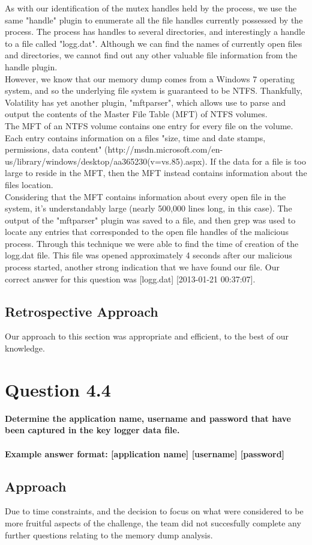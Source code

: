 As with our identification of the mutex handles held by the process, we use the same "handle" plugin to enumerate all the file handles currently possessed by the process. The process has handles to several directories, and interestingly a handle to a file called "logg.dat". Although we can find the names of currently open files and directories, we cannot find out any other valuable file information from the handle plugin.\\
However, we know that our memory dump comes from a Windows 7 operating system, and so the underlying file system is guaranteed to be NTFS. Thankfully, Volatility has yet another plugin, "mftparser", which allows use to parse and output the contents of the Master File Table (MFT) of NTFS volumes.\\
The MFT of an NTFS volume contains one entry for every file on the volume. Each entry contains information on a files "size, time and date stamps, permissions, data content" (http://msdn.microsoft.com/en-us/library/windows/desktop/aa365230(v=vs.85).aspx). If the data for a file is too large to reside in the MFT, then the MFT instead contains information about the files location.\\
Considering that the MFT contains information about every open file in the system, it's understandably large (nearly 500,000 lines long, in this case). The output of the "mftparser" plugin was saved to a file, and then grep was used to locate any entries that corresponded to the open file handles of the malicious process. Through this technique we were able to find the time of creation of the logg.dat file. This file was opened approximately 4 seconds after our malicious process started, another strong indication that we have found our file. Our correct answer for this question was [logg.dat] [2013-01-21 00:37:07]. 
\subsection{Retrospective Approach}
Our approach to this section was appropriate and efficient, to the best of our knowledge. 
\section{Question 4.4}
\textbf{Determine the application name, username and password that have been
captured in the key logger data file.
\\\\
Example answer format: [application name] [username] [password]}
\subsection{Approach}
Due to time constraints, and the decision to focus on what were considered to be more fruitful aspects of the challenge, the team did not succesfully complete any further questions relating to the memory dump analysis.

